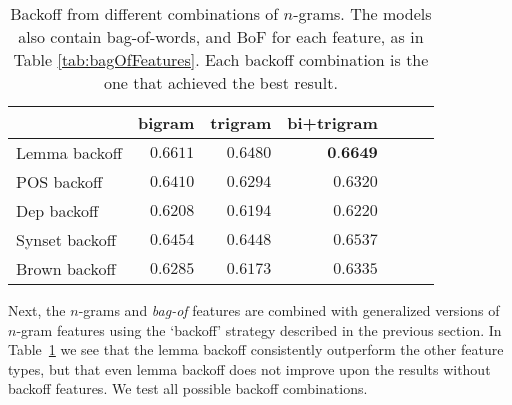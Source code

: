 \documentclass[11pt,letterpaper]{article}
\begin{document}
\begin{table}
  \begin{smaller}    
  \begin{center}
    \begin{tabular}{lrrrrrr}
      \toprule
      & bigram & trigram & bi+trigram \\
      \midrule
      Lemma backoff & $0.6611$ & $0.6480$ &  $\textbf{0.6649}$ \\ 
      POS backoff & $0.6410$ & $0.6294$ & $0.6320$ \\
      Dep backoff & $0.6208$ & $0.6194$ & $0.6220$ \\
      Synset backoff & $0.6454$ & $0.6448$ &  $0.6537$\\
      Brown backoff & $0.6285$ &  $0.6173$  & $0.6335$\\
      
      
      \bottomrule

    \end{tabular}
  \end{center}
  \caption{Backoff from different combinations of $n$-grams. The models also
    contain bag-of-words, and BoF for each feature, as in Table \ref{tab:bagOfFeatures}. Each backoff combination is the one that achieved the best result.}
  \label{tab:ngrambackoff}
  \end{smaller}
\end{table}

Next, the $n$-grams and \emph{bag-of} features are combined with generalized versions of $n$-gram features using the `backoff' strategy described in the previous section. In Table~\ref{tab:ngrambackoff} we see that the lemma backoff consistently outperform the other feature types, but that even lemma backoff does not improve upon the results without backoff features. We test all possible backoff combinations.
\end{document}
